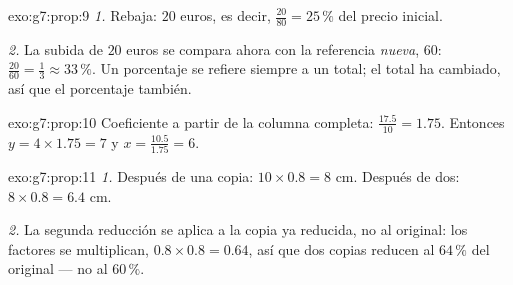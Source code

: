 \begin{solution}{exo:g7:prop:9}
\emph{1.} Rebaja: $20$ euros, es decir, $\frac{20}{80} = 25\,\%$ del
precio inicial.

\emph{2.} La subida de $20$ euros se compara ahora con la referencia \emph{nueva},
$60$: $\frac{20}{60} = \frac13 \approx 33\,\%$. Un porcentaje
se refiere siempre a un total; el total ha cambiado, así que el porcentaje
también.
\end{solution}

\begin{solution}{exo:g7:prop:10}
Coeficiente a partir de la columna completa: $\frac{17.5}{10} = 1.75$. Entonces
$y = 4 \times 1.75 = 7$ y $x = \frac{10.5}{1.75} = 6$.
\end{solution}

\begin{solution}{exo:g7:prop:11}
\emph{1.} Después de una copia: $10 \times 0.8 = 8$ cm. Después de dos:
$8 \times 0.8 = 6.4$ cm.

\emph{2.} La segunda reducción se aplica a la copia ya reducida,
no al original: los factores se multiplican,
$0.8 \times 0.8 = 0.64$, así que dos copias reducen al $64\,\%$ del
original --- no al $60\,\%$.
\end{solution}

